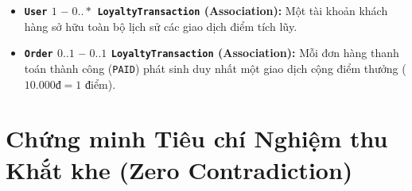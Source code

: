 \documentclass[12pt,a4paper]{article}
\begin{document}
\begin{itemize}[leftmargin=*,itemsep=3pt]
    \item \textbf{\texttt{User} $1$ -- $0..*$ \texttt{LoyaltyTransaction} (Association):} Một tài khoản khách hàng sở hữu toàn bộ lịch sử các giao dịch điểm tích lũy.
    \item \textbf{\texttt{Order} $0..1$ -- $0..1$ \texttt{LoyaltyTransaction} (Association):} Mỗi đơn hàng thanh toán thành công (\texttt{PAID}) phát sinh duy nhất một giao dịch cộng điểm thưởng ($10.000\text{đ} = 1\text{ điểm}$).
\end{itemize}

\section{Chứng minh Tiêu chí Nghiệm thu Khắt khe (Zero Contradiction)}

\vspace{0.2cm}
\noindent
\footnotesize
\renewcommand{\arraystretch}{1.25}
\end{document}
